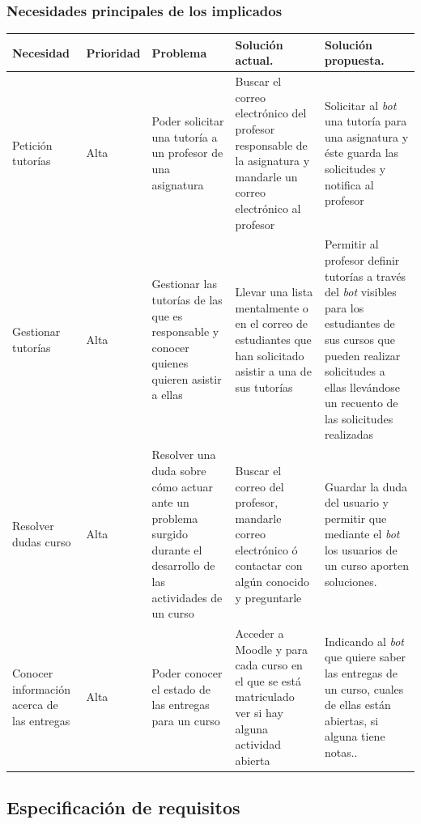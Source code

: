 \subsubsection{Necesidades principales de los implicados}



\begin{table}[H]
\medskip 
\begin{tabular}{|p{2cm}|p{1.6cm}|p{2.5cm}|p{3.5cm}| p{4cm}|}
\hline
{\bf Necesidad } & {\bf Prioridad } & {\bf Problema } & {\bf  Solución actual.} & {\bf  Solución propuesta.}\\
\hline
{ Petición tutorías }& { Alta } & { Poder solicitar una tutoría a un profesor de una asignatura } & {Buscar el correo electrónico del profesor responsable de la asignatura y mandarle un correo electrónico al profesor } & { Solicitar al \textit{bot} una tutoría para una asignatura y éste guarda las solicitudes y notifica al profesor}\\
\hline
{ Gestionar tutorías }& { Alta } & { Gestionar las tutorías de las que es responsable y conocer quienes quieren asistir a ellas } & {Llevar una lista mentalmente o en el correo de estudiantes que han solicitado asistir a una de sus tutorías} & { Permitir al profesor definir tutorías a través del \textit{bot} visibles para los estudiantes de sus cursos que pueden realizar solicitudes a ellas llevándose un recuento de las solicitudes realizadas}\\
\hline
{ Resolver dudas curso }& { Alta } & { Resolver una duda sobre cómo actuar ante un problema surgido durante el desarrollo de las actividades de un curso }& { Buscar el correo del profesor, mandarle correo electrónico ó contactar con algún conocido y preguntarle } & { Guardar la duda del usuario y permitir que mediante el \textit{bot} los usuarios de un curso aporten soluciones.}\\
\hline
{ Conocer información acerca de las entregas  } & { Alta} & { Poder conocer el estado de las entregas para un curso}& { Acceder a Moodle y para cada curso en el que se está matriculado ver si hay alguna actividad abierta } & {Indicando al \textit{bot} que quiere saber las entregas de un curso, cuales de ellas están abiertas, si alguna tiene notas..} \\
\hline


\end{tabular}
\end{table}
\newpage
\subsection{Especificación de requisitos}

